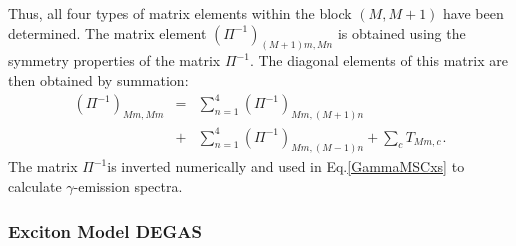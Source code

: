 \documentclass[twocolumn,amsmath,amssymb,10pt,groupedaddress,a4paper]{revtex4}
\begin{document}
Thus, all four types of matrix elements within the block $(M,M+1)$
have been determined. The matrix element $(\Pi^{-1})_{(M+1)m,Mn}$
is obtained using the symmetry properties of the matrix $\Pi^{-1}$.
The diagonal elements of this matrix are then obtained by summation:
\begin{eqnarray}
(\Pi^{-1})_{Mm,Mm} &=& \sum_{n=1}^{4}(\Pi^{-1})_{Mm,(M+1)n}  \\
&+& \sum_{n=1}^{4}(\Pi^{-1})_{Mm,(M-1)n} + \sum_{c}T_{Mm,c} \hspace{1pt}.\nonumber
\end{eqnarray}
The matrix $\Pi^{-1}$is inverted numerically and used in Eq.\ref{GammaMSCxs}
to calculate $\gamma$-emission spectra.



\subsubsection{Exciton Model DEGAS\label{DEGAS}}
\end{document}
